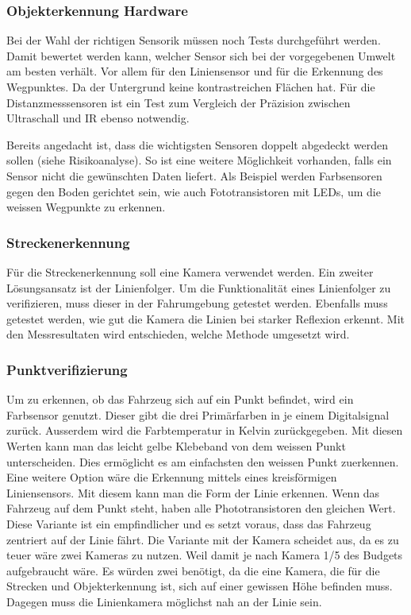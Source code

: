 \documentclass[../main.tex]{subfiles}
\begin{document}
\subsubsection{Objekterkennung Hardware}
 Bei der Wahl der richtigen Sensorik müssen noch Tests durchgeführt werden. Damit bewertet werden kann, welcher Sensor sich bei der vorgegebenen Umwelt am besten verhält. Vor allem für den Liniensensor und für die Erkennung des Wegpunktes. Da der Untergrund keine kontrastreichen Flächen hat. Für die Distanzmesssensoren ist ein Test zum Vergleich der Präzision zwischen Ultraschall und IR ebenso notwendig.
 
 Bereits angedacht ist, dass  die wichtigsten Sensoren doppelt abgedeckt werden sollen (siehe Risikoanalyse). So ist eine weitere Möglichkeit vorhanden, falls ein Sensor nicht die gewünschten Daten liefert. Als Beispiel werden Farbsensoren gegen den Boden gerichtet sein, wie auch Fototransistoren mit LEDs, um die weissen Wegpunkte zu erkennen.

\subsubsection{Streckenerkennung}
Für die Streckenerkennung soll eine Kamera verwendet werden. Ein zweiter Lösungsansatz ist der Linienfolger. Um die Funktionalität eines Linienfolger zu verifizieren, muss dieser in der Fahrumgebung getestet werden. Ebenfalls muss getestet werden, wie gut die Kamera die Linien bei starker Reflexion erkennt. Mit den Messresultaten wird entschieden, welche Methode umgesetzt wird.


\subsubsection{Punktverifizierung}
Um zu erkennen, ob das Fahrzeug sich auf ein Punkt befindet, wird ein Farbsensor genutzt. Dieser gibt die drei Primärfarben in je einem Digitalsignal zurück. Ausserdem wird die Farbtemperatur in Kelvin zurückgegeben. Mit diesen Werten kann man das leicht gelbe Klebeband von dem weissen Punkt unterscheiden. Dies ermöglicht es am einfachsten den weissen Punkt zuerkennen. Eine weitere Option wäre die Erkennung mittels eines kreisförmigen Liniensensors. Mit diesem kann man die Form der Linie erkennen. Wenn das Fahrzeug auf dem Punkt steht, haben alle Phototransistoren den gleichen Wert. Diese Variante ist ein empfindlicher und es setzt voraus, dass das Fahrzeug zentriert auf der Linie fährt. Die Variante mit der Kamera scheidet aus, da es zu teuer wäre zwei Kameras zu nutzen. Weil damit je nach Kamera 1/5 des Budgets aufgebraucht wäre. Es würden zwei benötigt, da die eine Kamera, die für die Strecken und Objekterkennung ist, sich auf einer gewissen Höhe befinden muss. Dagegen muss die Linienkamera möglichst nah an der Linie sein.
\end{document}
